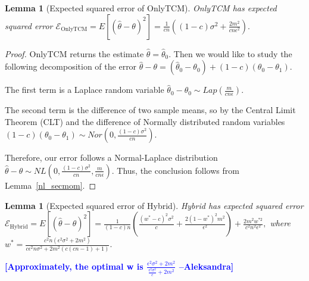 \documentclass{article}
\newcommand{\ak}[1]{\textcolor{blue}{\bf\small [#1 --Aleksandra]}}
\theoremstyle{plain}
\newtheorem{lem}[thm]{Lemma}
\begin{document}
\begin{lem}[Expected squared error of OnlyTCM]
\label{MSE_OnlyTCM}
OnlyTCM has expected squared error
$\mathcal{E}_{\text{OnlyTCM}} = E[(\hat{\theta} - \theta)^2] = \frac{1}{cn}\left((1-c)\sigma^2 + \frac{2m^2}{cn \epsilon^2 }\right).$
\end{lem}
\begin{proof}
OnlyTCM returns the estimate $\hat{\theta} = \hat{\theta}_0$. Then we would like to study the following decomposition of the error
$\hat{\theta} - \theta = (\hat{\theta}_0 - \theta_0) + (1-c)(\theta_0 - \theta_1).$

The first term is a Laplace random variable
$\hat{\theta}_0 - \theta_0 \sim Lap\left(\frac{m}{cn\epsilon}\right).$

The second term is the difference of two sample means, so by the Central Limit Theorem (CLT) and the difference of Normally distributed random variables
$(1-c)(\theta_0 - \theta_1) \sim Nor\left(0, \frac{(1-c)\sigma^2}{cn}\right).$

Therefore, our error follows a Normal-Laplace distribution
$\hat{\theta} - \theta \sim NL\left(0, \frac{(1-c)\sigma^2}{cn}, \frac{m}{cn\epsilon} \right).$
Thus, the conclusion follows from Lemma~\ref{nl_secmom}.
\end{proof}

\begin{lem}[Expected squared error of Hybrid]\label{lem:hybrid-error}
Hybrid has expected squared error 
$\mathcal{E}_{\text{Hybrid}} = E[(\hat{\theta} - \theta)^2] = \frac{1}{(1-c)n}\left(\frac{(w^*-c)^2\sigma^2}{c} + \frac{2(1-w^*)^2 m^2}{\epsilon^2}\right) + \frac{2m^2w^{*2}}{c^2n^2\epsilon^2},$
where
$w^* = \frac{c^2 n \left(\epsilon^2 \sigma^2+2 m^2\right)}{c \epsilon^2 n \sigma^2+2 m^2 (c (c n-1)+1)}.$
\end{lem}

\ak{Approximately, the optimal w is $\frac{\epsilon^2 \sigma^2+2 m^2}{\frac{\epsilon^2 \sigma^2}{c}+2 m^2}$}
\end{document}
